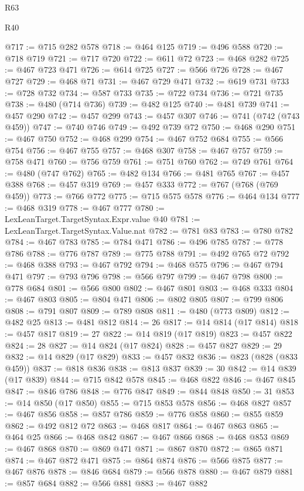\begin{lexlean}{R63}
\begin{lexlean}{R40}
\begin{coremodule}
{{{{{{{{{{{{{{{{{{{{{{{{{{{{{{{{{{{{{{{{{{{{{{{{{{{{{{{{{{{{{{{{{{{{{{{{{{{{{{{{{{{{{{{{{{{{{{{{{{{{{{{{{{{{{@717 := @715 @282 @578
@718 := @464 @125
@719 := @496 @588
@720 := @718 @719
@721 := @717 @720
@722 := @611 @72
@723 := @468 @282
@725 := @467 @723 @471
@726 := @614 @725
@727 := @566 @726
@728 := @467 @727
@729 := @468 @71
@731 := @467 @729 @471
@732 := @619 @731
@733 := @728 @732
@734 := @587 @733
@735 := @722 @734
@736 := @721 @735
@738 := @480 (@714 @736)
@739 := @482 @125
@740 := @481 @739
@741 := @457 @290
@742 := @457 @299
@743 := @457 @307
@746 := @741 (@742 (@743 @459))
@747 := @740 @746
@749 := @492 @739 @72
@750 := @468 @290
@751 := @467 @750
@752 := @468 @299
@754 := @467 @752 @684
@755 := @566 @754
@756 := @467 @755
@757 := @468 @307
@758 := @467 @757
@759 := @758 @471
@760 := @756 @759
@761 := @751 @760
@762 := @749 @761
@764 := @480 (@747 @762)
@765 := @482 @134
@766 := @481 @765
@767 := @457 @388
@768 := @457 @319
@769 := @457 @333
@772 := @767 (@768 (@769 @459))
@773 := @766 @772
@775 := @715 @575 @578
@776 := @464 @134
@777 := @468 @319
@778 := @467 @777
@780 := LexLeanTarget.TargetSyntax.Expr.value @40
@781 := LexLeanTarget.TargetSyntax.Value.nat
@782 := @781 @83
@783 := @780 @782
@784 := @467 @783
@785 := @784 @471
@786 := @496 @785
@787 := @778 @786
@788 := @776 @787
@789 := @775 @788
@791 := @492 @765 @72
@792 := @468 @388
@793 := @467 @792
@794 := @468 @575
@796 := @467 @794 @471
@797 := @793 @796
@798 := @566 @797
@799 := @467 @798
@800 := @778 @684
@801 := @566 @800
@802 := @467 @801
@803 := @468 @333
@804 := @467 @803
@805 := @804 @471
@806 := @802 @805
@807 := @799 @806
@808 := @791 @807
@809 := @789 @808
@811 := @480 (@773 @809)
@812 := @482 @25
@813 := @481 @812
@814 := 26
@817 := @14 @814 (@17 @814)
@818 := @457 @817
@819 := 27
@822 := @14 @819 (@17 @819)
@823 := @457 @822
@824 := 28
@827 := @14 @824 (@17 @824)
@828 := @457 @827
@829 := 29
@832 := @14 @829 (@17 @829)
@833 := @457 @832
@836 := @823 (@828 (@833 @459))
@837 := @818 @836
@838 := @813 @837
@839 := 30
@842 := @14 @839 (@17 @839)
@844 := @715 @842 @578
@845 := @468 @822
@846 := @467 @845
@847 := @846 @786
@848 := @776 @847
@849 := @844 @848
@850 := 31
@853 := @14 @850 (@17 @850)
@855 := @715 @853 @578
@856 := @468 @827
@857 := @467 @856
@858 := @857 @786
@859 := @776 @858
@860 := @855 @859
@862 := @492 @812 @72
@863 := @468 @817
@864 := @467 @863
@865 := @464 @25
@866 := @468 @842
@867 := @467 @866
@868 := @468 @853
@869 := @467 @868
@870 := @869 @471
@871 := @867 @870
@872 := @865 @871
@874 := @467 @872 @471
@875 := @864 @874
@876 := @566 @875
@877 := @467 @876
@878 := @846 @684
@879 := @566 @878
@880 := @467 @879
@881 := @857 @684
@882 := @566 @881
@883 := @467 @882
}}}}}}}}}}}}}}}}}}}}}}}}}}}}}}}}}}}}}}}}}}}}}}}}}}}}}}}}}}}}}}}}}}}}}}}}}}}}}}}}}}}}}}}}}}}}}}}}}}}}}}}}}}}}}
\end{coremodule}
\end{lexlean}
\end{lexlean}

